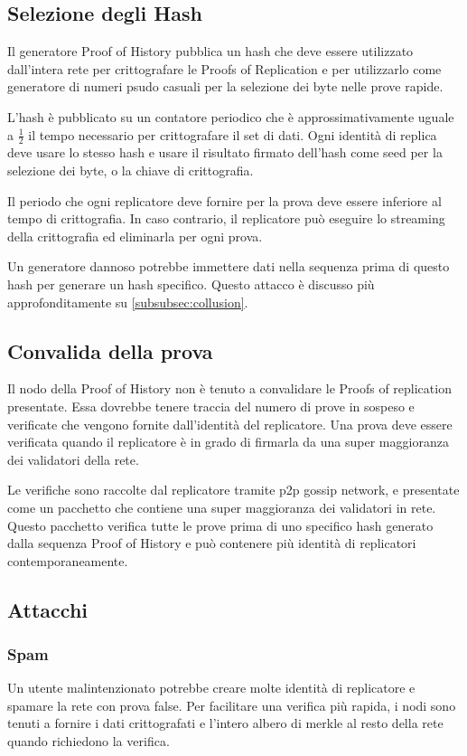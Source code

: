 \documentclass[12pt]{article}
\begin{document}
\subsection{Selezione degli Hash}\label{hashselection}

Il generatore Proof of History pubblica un hash che deve essere utilizzato dall'intera rete per crittografare le Proofs of Replication e per utilizzarlo come generatore di numeri psudo casuali per la selezione dei byte nelle prove rapide.

L'hash è pubblicato su un contatore periodico che è approssimativamente uguale a \(\frac{1}{2}\) il tempo necessario per crittografare il set di dati. Ogni identità di replica deve usare lo stesso hash e usare il risultato firmato dell'hash come seed per la selezione dei byte, o la chiave di crittografia.

Il periodo che ogni replicatore deve fornire per la prova deve essere inferiore al tempo di crittografia. In caso contrario, il replicatore può eseguire lo streaming della crittografia ed eliminarla per ogni prova.

Un generatore dannoso potrebbe immettere dati nella sequenza prima di questo hash per generare un hash specifico. Questo attacco è discusso più approfonditamente su \ref{subsubsec:collusion}.

\subsection{Convalida della prova}
Il nodo della Proof of History non è tenuto a convalidare le Proofs of replication presentate. Essa dovrebbe tenere traccia del numero di prove in sospeso e verificate che vengono fornite dall'identità del replicatore. Una prova deve essere verificata quando il replicatore è in grado di firmarla da una super maggioranza dei validatori della rete.

Le verifiche sono raccolte dal replicatore tramite p2p gossip network, e presentate come un pacchetto che contiene una super maggioranza dei validatori in rete. Questo pacchetto verifica tutte le prove prima di uno specifico hash generato dalla sequenza Proof of History e può contenere più identità di replicatori contemporaneamente.
\subsection{Attacchi}
\subsubsection{Spam}
Un utente malintenzionato potrebbe creare molte identità di replicatore e spamare la rete con prova false. Per facilitare una verifica più rapida, i nodi sono tenuti a fornire i dati crittografati e l'intero albero di merkle al resto della rete quando richiedono la verifica.
\end{document}
